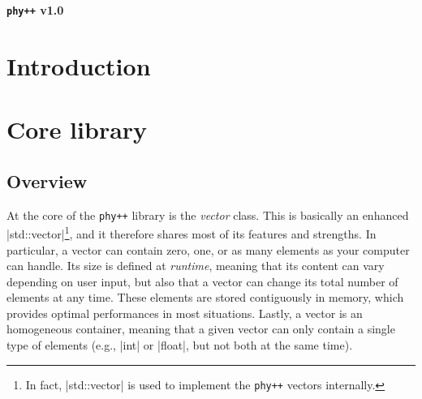 \documentclass[12pt]{report}
\newcommand{\phypp}{\texttt{phy++}\xspace}
\newcommand{\stdvec}{\cppinline|std::vector|\xspace}
\begin{document}
\begin{center}
\Large \bf \phypp v1.0
\end{center}

\tableofcontents

\chapter{Introduction \label{SEC:intro}}



\chapter{Core library \label{SEC:core}}

\section{Overview \label{SEC:core:overview}}
At the core of the \phypp library is the \emph{vector} class. This is basically an enhanced \stdvec\footnote{In fact, \stdvec is used to implement the \phypp vectors internally.}, and it therefore shares most of its features and strengths. In particular, a vector can contain zero, one, or as many elements as your computer can handle. Its size is defined at \emph{runtime}, meaning that its content can vary depending on user input, but also that a vector can change its total number of elements at any time. These elements are stored contiguously in memory, which provides optimal performances in most situations. Lastly, a vector is an homogeneous container, meaning that a given vector can only contain a single type of elements (e.g., \cppinline|int| or \cppinline|float|, but not both at the same time).
\end{document}
